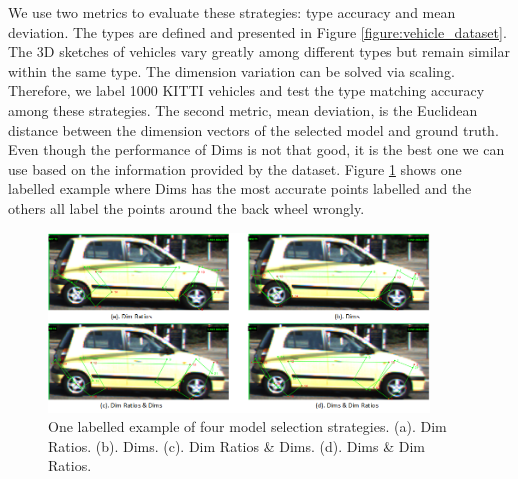 \documentclass[a4paper,12pt]{article}
\begin{document}
We use two metrics to evaluate these strategies: type accuracy and mean deviation. The types are defined and presented in Figure \ref{figure:vehicle_dataset}. The 3D sketches of vehicles vary greatly among different types but remain similar within the same type. The dimension variation can be solved via scaling. Therefore, we label 1000 KITTI vehicles and test the type matching accuracy among these strategies. The second metric, mean deviation, is the Euclidean distance between the dimension vectors of the selected model and ground truth. Even though the performance of Dims is not that good, it is the best one we can use based on the information provided by the dataset. Figure \ref{figure:model_selection_s} shows one labelled example where Dims has the most accurate points labelled and the others all label the points around the back wheel wrongly.

\renewcommand{\arraystretch}{1.2}
\begin{table}[ht]
	\centering
	\caption{Performance of four model selection strategies.}
	\label{model_selection}
\end{table}


\begin{figure}[H]		
	\includegraphics[width=0.9\textwidth]{model_selection_s.png}
	\caption[One labelled example of four model selection strategies.]{One labelled example of four model selection strategies. (a). Dim Ratios. (b). Dims. (c). Dim Ratios \& Dims. (d). Dims \& Dim Ratios. }
	\centering
	\label{figure:model_selection_s}
\end{figure}
\end{document}
